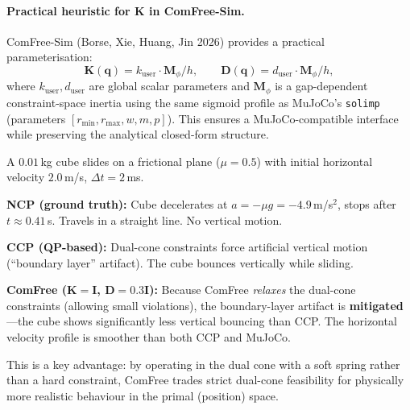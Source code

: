 \documentclass[11pt,twoside]{report}
\theoremstyle{definition}
\theoremstyle{plain}
\theoremstyle{remark}
\newcommand{\q}{\bm{q}}
\newcommand{\0}{\bm{0}}
\begin{document}
\paragraph{Practical heuristic for $\bm{K}$ in ComFree-Sim.}
ComFree-Sim (Borse, Xie, Huang, Jin 2026) provides a practical parameterisation:
\begin{equation}
\bm{K}(\q)=k_{\text{user}}\cdot\bm{M}_{\phi}/h,\qquad
\bm{D}(\q)=d_{\text{user}}\cdot\bm{M}_{\phi}/h,
\end{equation}
where $k_{\text{user}},d_{\text{user}}$ are global scalar parameters
and $\bm{M}_{\phi}$ is a gap-dependent constraint-space inertia
using the same sigmoid profile as MuJoCo's \texttt{solimp}
(parameters $[r_{\min},r_{\max},w,m,p]$).
This ensures a MuJoCo-compatible interface while preserving the
analytical closed-form structure.

\begin{examplebox}
A $0.01$\,kg cube slides on a frictional plane ($\mu=0.5$) with initial
horizontal velocity $2.0$\,m/s, $\Delta t=2$\,ms.

\textbf{NCP (ground truth):} Cube decelerates at $a=-\mu g=-4.9$\,m/s$^{2}$,
stops after $t\approx 0.41$\,s.  Travels in a straight line.  No vertical motion.

\textbf{CCP (QP-based):} Dual-cone constraints force artificial vertical motion
(``boundary layer'' artifact). The cube bounces vertically while sliding.

\textbf{ComFree ($\bm{K}=\bm{I}$, $\bm{D}=0.3\bm{I}$):}
Because ComFree \emph{relaxes} the dual-cone constraints (allowing small violations),
the boundary-layer artifact is \textbf{mitigated}---the cube shows significantly
less vertical bouncing than CCP.  The horizontal velocity profile is smoother
than both CCP and MuJoCo.

This is a key advantage: by operating in the dual cone with a soft spring
rather than a hard constraint, ComFree trades strict dual-cone feasibility
for physically more realistic behaviour in the primal (position) space.
\end{examplebox}
\end{document}
